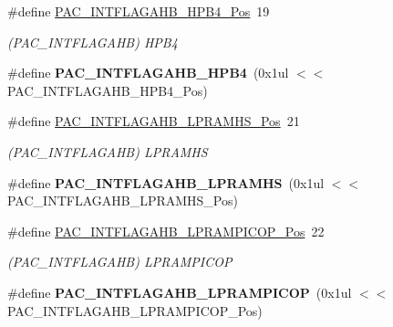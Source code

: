 \begin{DoxyCompactItemize}
\item 
\hypertarget{group___s_a_m_l21___p_a_c_gad197b30a3f02403bda3e84a239dd48f6}{}\#define \hyperlink{group___s_a_m_l21___p_a_c_gad197b30a3f02403bda3e84a239dd48f6}{P\+A\+C\+\_\+\+I\+N\+T\+F\+L\+A\+G\+A\+H\+B\+\_\+\+H\+P\+B4\+\_\+\+Pos}~19\label{group___s_a_m_l21___p_a_c_gad197b30a3f02403bda3e84a239dd48f6}

\begin{DoxyCompactList}\small\item\em (P\+A\+C\+\_\+\+I\+N\+T\+F\+L\+A\+G\+A\+H\+B) H\+P\+B4 \end{DoxyCompactList}\item 
\hypertarget{group___s_a_m_l21___p_a_c_gaf5c3e633ba3d960535ea148f84a97413}{}\#define {\bfseries P\+A\+C\+\_\+\+I\+N\+T\+F\+L\+A\+G\+A\+H\+B\+\_\+\+H\+P\+B4}~(0x1ul $<$$<$ P\+A\+C\+\_\+\+I\+N\+T\+F\+L\+A\+G\+A\+H\+B\+\_\+\+H\+P\+B4\+\_\+\+Pos)\label{group___s_a_m_l21___p_a_c_gaf5c3e633ba3d960535ea148f84a97413}

\item 
\hypertarget{group___s_a_m_l21___p_a_c_ga41782e7e46d6168fe1a524d5c15652ec}{}\#define \hyperlink{group___s_a_m_l21___p_a_c_ga41782e7e46d6168fe1a524d5c15652ec}{P\+A\+C\+\_\+\+I\+N\+T\+F\+L\+A\+G\+A\+H\+B\+\_\+\+L\+P\+R\+A\+M\+H\+S\+\_\+\+Pos}~21\label{group___s_a_m_l21___p_a_c_ga41782e7e46d6168fe1a524d5c15652ec}

\begin{DoxyCompactList}\small\item\em (P\+A\+C\+\_\+\+I\+N\+T\+F\+L\+A\+G\+A\+H\+B) L\+P\+R\+A\+M\+H\+S \end{DoxyCompactList}\item 
\hypertarget{group___s_a_m_l21___p_a_c_gaa618592cdca90bdb4b65d71b61471ae9}{}\#define {\bfseries P\+A\+C\+\_\+\+I\+N\+T\+F\+L\+A\+G\+A\+H\+B\+\_\+\+L\+P\+R\+A\+M\+H\+S}~(0x1ul $<$$<$ P\+A\+C\+\_\+\+I\+N\+T\+F\+L\+A\+G\+A\+H\+B\+\_\+\+L\+P\+R\+A\+M\+H\+S\+\_\+\+Pos)\label{group___s_a_m_l21___p_a_c_gaa618592cdca90bdb4b65d71b61471ae9}

\item 
\hypertarget{group___s_a_m_l21___p_a_c_gabad637c65c4d41f8511b80d4ef5e2ba8}{}\#define \hyperlink{group___s_a_m_l21___p_a_c_gabad637c65c4d41f8511b80d4ef5e2ba8}{P\+A\+C\+\_\+\+I\+N\+T\+F\+L\+A\+G\+A\+H\+B\+\_\+\+L\+P\+R\+A\+M\+P\+I\+C\+O\+P\+\_\+\+Pos}~22\label{group___s_a_m_l21___p_a_c_gabad637c65c4d41f8511b80d4ef5e2ba8}

\begin{DoxyCompactList}\small\item\em (P\+A\+C\+\_\+\+I\+N\+T\+F\+L\+A\+G\+A\+H\+B) L\+P\+R\+A\+M\+P\+I\+C\+O\+P \end{DoxyCompactList}\item 
\hypertarget{group___s_a_m_l21___p_a_c_ga54c7b75d2192c9dcfaf9e409acaf017e}{}\#define {\bfseries P\+A\+C\+\_\+\+I\+N\+T\+F\+L\+A\+G\+A\+H\+B\+\_\+\+L\+P\+R\+A\+M\+P\+I\+C\+O\+P}~(0x1ul $<$$<$ P\+A\+C\+\_\+\+I\+N\+T\+F\+L\+A\+G\+A\+H\+B\+\_\+\+L\+P\+R\+A\+M\+P\+I\+C\+O\+P\+\_\+\+Pos)\label{group___s_a_m_l21___p_a_c_ga54c7b75d2192c9dcfaf9e409acaf017e}


\end{DoxyCompactItemize}
